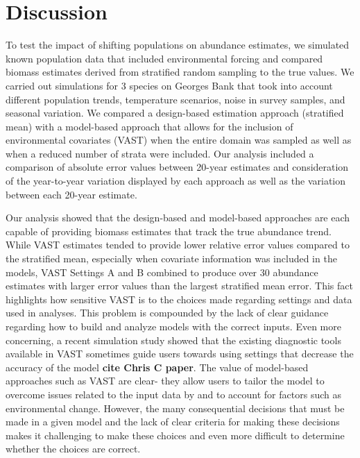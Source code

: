 \documentclass[
  12pt,
]{article}
\begin{document}
\section{Discussion}

To test the impact of shifting populations on abundance estimates, we simulated known population data that included environmental forcing and compared biomass estimates derived from stratified random sampling to the true values. We carried out simulations for 3 species on Georges Bank that took into account different population trends, temperature scenarios, noise in survey samples, and seasonal variation. We compared a design-based estimation approach (stratified mean) with a model-based approach that allows for the inclusion of environmental covariates (VAST) when the entire domain was sampled as well as when a reduced number of strata were included. Our analysis included a comparison of absolute error values between 20-year estimates and consideration of the year-to-year variation displayed by each approach as well as the variation between each 20-year estimate.

Our analysis showed that the design-based and model-based approaches are each capable of providing biomass estimates that track the true abundance trend. While VAST estimates tended to provide lower relative error values compared to the stratified mean, especially when covariate information was included in the models, VAST Settings A and B combined to produce over 30 abundance estimates with larger error values than the largest stratified mean error. This fact highlights how sensitive VAST is to the choices made regarding settings and data used in analyses. This problem is compounded by the lack of clear guidance regarding how to build and analyze models with the correct inputs. Even more concerning, a recent simulation study showed that the existing diagnostic tools available in VAST sometimes guide users towards using settings that decrease the accuracy of the model \textbf{cite Chris C paper}. The value of model-based approaches such as VAST are clear- they allow users to tailor the model to overcome issues related to the input data by and to account for factors such as environmental change. However, the many consequential decisions that must be made in a given model and the lack of clear criteria for making these decisions makes it challenging to make these choices and even more difficult to determine whether the choices are correct.
\end{document}

